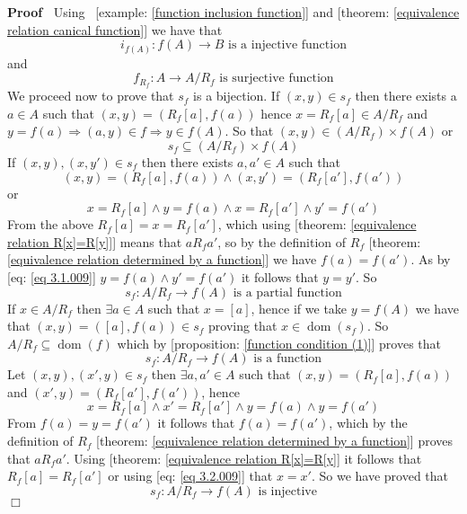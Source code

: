 \documentclass{book}
\newcommand{\tmop}[1]{\ensuremath{\operatorname{#1}}}
\newenvironment{proof}{\noindent\textbf{Proof\ }}{\hspace*{\fill}$\Box$\medskip}
\begin{document}
\begin{proof}
  Using \ [example: \ref{function inclusion function}] and [theorem:
  \ref{equivalence relation canical function}] we have that
  \[ i_{f (A)} : f (A) \rightarrow B \text{ is a injective function} \]
  and
  \[ f_{R_f} : A \rightarrow A / R_f \text{ is surjective function} \]
  We proceed now to prove that $s_f$ is a bijection. If $(x, y) \in s_f$ then
  there exists a $a \in A$ such that $(x, y) = (R_f [a], f (a))$ hence $x =
  R_f [a] \in A / R_f$ and $y = f (a) \Rightarrow (a, y) \in f \Rightarrow y
  \in f (A)$. So that $(x, y) \in (A / R_f) \times f (A)$ or
  \[ s_f \subseteq (A / R_f) \times f (A) \]
  If $(x, y), (x, y') \in s_f$ then there exists $a, a' \in A$ such that
  \[ (x, y) = (R_f [a], f (a)) \wedge (x, y') = (R_f [a'], f (a')) \]
  or
  \begin{equation}
    \label{eq 3.1.009} x = R_f [a] \wedge y = f (a) \wedge x = R_f [a'] \wedge
    y' = f (a')
  \end{equation}
  From the above $R_f [a] = x = R_f [a']$, which using [theorem:
  \ref{equivalence relation R[x]=R[y]}] means that $a R_f a'$, so by the
  definition of $R_f$ [theorem: \ref{equivalence relation determined by a
  function}] we have $f (a) = f (a')$. As by [eq: \ref{eq 3.1.009}] $y = f (a)
  \wedge y' = f (a')$ it follows that $y = y'$. So
  \[ s_f : A / R_f \rightarrow f (A) \text{ is a partial function} \]
  If $x \in A / R_f$ then $\exists a \in A$ such that $x = [a]$, hence if we
  take $y = f (A)$ we have that $(x, y) = ([a], f (a)) \in s_f$ proving that
  $x \in \tmop{dom} (s_f)$. So $A / R_f \subseteq \tmop{dom} (f)$ which by
  [proposition: \ref{function condition (1)}] proves that
  \[ s_f : A / R_f \rightarrow f (A) \text{ is a function} \]
  Let $(x, y), (x', y) \in s_f$ then $\exists a, a' \in A$ such that $(x, y) =
  (R_f [a], f (a))$ and $(x', y) = (R_f [a'], f (a'))$, hence
  \begin{equation}
    \label{eq 3.2.009} x = R_f [a] \wedge x' = R_f [a'] \wedge y = f (a)
    \wedge y = f (a')
  \end{equation}
  From $f (a) = y = f (a')$ it follows that $f (a) = f (a')$, which by the
  definition of $R_f$ [theorem: \ref{equivalence relation determined by a
  function}] proves that $a R_f a'$. Using [theorem: \ref{equivalence relation
  R[x]=R[y]} it follows that $R_f [a] = R_f [a']$ or using [eq: \ref{eq
  3.2.009}] that $x = x'$. So we have proved that
  \begin{equation}
    \label{eq 3.3.009} s_f : A / R_f \rightarrow f (A) \text{ is injective}

\end{equation}
\end{proof}
\end{document}
